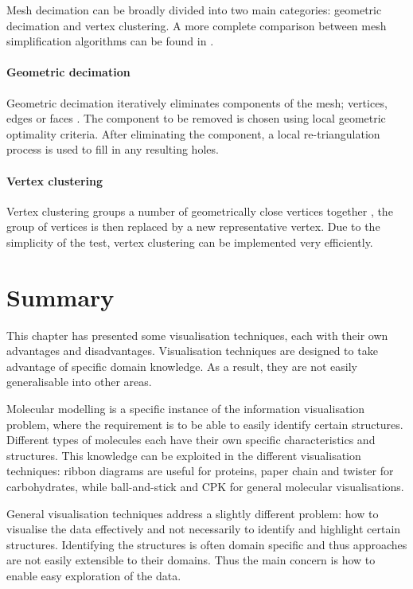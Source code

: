 Mesh decimation can be broadly divided into two main categories: geometric
decimation and vertex clustering. A more complete comparison between mesh
simplification algorithms can be found in \citet{cignoni98}.

\paragraph{Geometric decimation}

Geometric decimation iteratively eliminates components of the mesh; vertices,
edges or faces \citep{schroeder92}. The component to be removed is chosen using
local geometric optimality criteria. After eliminating the component, a local
re-triangulation process is used to fill in any resulting holes.


\paragraph{Vertex clustering}

Vertex clustering groups a number of geometrically close vertices together
\citep{rossignac93}, the group of vertices is then replaced by a new
representative vertex.  Due to the simplicity of the test, vertex clustering
can be implemented very efficiently.



\section{Summary}
\label{sec:background_end}

This chapter has presented some visualisation techniques, each with their own
advantages and disadvantages. Visualisation techniques are designed to take
advantage of specific domain knowledge. As a result, they are not easily
generalisable into other areas.

Molecular modelling is a specific instance of the information visualisation
problem, where the requirement is to be able to easily identify certain
structures. Different types of molecules each have their own specific
characteristics and structures. This knowledge can be exploited in the
different visualisation techniques: ribbon diagrams are useful for proteins,
paper chain and twister for carbohydrates, while ball-and-stick and CPK for
general molecular visualisations.

General visualisation techniques address a slightly different problem: how to
visualise the data effectively and not necessarily to identify and highlight
certain structures. Identifying the structures is often domain specific and
thus approaches are not easily extensible to their domains. Thus the main
concern is how to enable easy exploration of the data.

